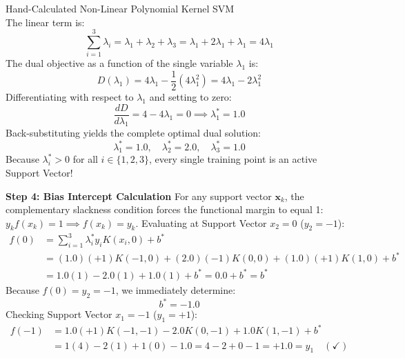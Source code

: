 \begin{examplebox}[breakable]{Hand-Calculated Non-Linear Polynomial Kernel SVM}
\begin{equation}
\end{equation}
The linear term is:
\begin{equation}
\sum_{i=1}^3 \lambda_i = \lambda_1 + \lambda_2 + \lambda_3 = \lambda_1 + 2\lambda_1 + \lambda_1 = 4\lambda_1
\end{equation}
The dual objective as a function of the single variable $\lambda_1$ is:
\begin{equation}
D(\lambda_1) = 4\lambda_1 - \frac{1}{2}(4\lambda_1^2) = 4\lambda_1 - 2\lambda_1^2
\end{equation}
Differentiating with respect to $\lambda_1$ and setting to zero:
\begin{equation}
\frac{dD}{d\lambda_1} = 4 - 4\lambda_1 = 0 \implies \lambda_1^* = 1.0
\end{equation}
Back-substituting yields the complete optimal dual solution:
\begin{equation}
\lambda_1^* = 1.0, \quad \lambda_2^* = 2.0, \quad \lambda_3^* = 1.0
\end{equation}
Because $\lambda_i^* > 0$ for all $i \in \{1, 2, 3\}$, every single training point is an active Support Vector!

\textbf{Step 4: Bias Intercept Calculation}
For any support vector $\mathbf{x}_k$, the complementary slackness condition forces the functional margin to equal 1: $y_k f(x_k) = 1 \implies f(x_k) = y_k$.
Evaluating at Support Vector $x_2 = 0$ ($y_2 = -1$):
\begin{align}
f(0) &= \sum_{i=1}^3 \lambda_i^* y_i K(x_i, 0) + b^* \nonumber \\
&= (1.0)(+1)K(-1, 0) + (2.0)(-1)K(0, 0) + (1.0)(+1)K(1, 0) + b^* \nonumber \\
&= 1.0(1) - 2.0(1) + 1.0(1) + b^* = 0.0 + b^* = b^*
\end{align}
Because $f(0) = y_2 = -1$, we immediately determine:
\begin{equation}
b^* = -1.0
\end{equation}
Checking Support Vector $x_1 = -1$ ($y_1 = +1$):
\begin{align}
f(-1) &= 1.0(+1)K(-1, -1) - 2.0K(0, -1) + 1.0K(1, -1) + b^* \nonumber \\
&= 1(4) - 2(1) + 1(0) - 1.0 = 4 - 2 + 0 - 1 = +1.0 = y_1 \quad (\checkmark)
\end{align}


\end{examplebox}
